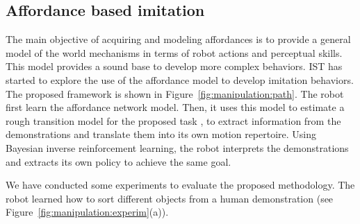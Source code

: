 \subsection{Affordance based imitation}
The main objective of acquiring and modeling affordances is to provide
a general model of the world mechanisms in terms of robot actions and
perceptual skills. This model provides a sound base to develop more
complex behaviors. IST has started to explore the use of the
affordance model to develop imitation behaviors. The proposed
framework is shown in Figure~\ref{fig:manipulation:path}. The robot
first learn the affordance network model. Then, it uses this model to
estimate a rough transition model for the proposed task , to extract
information from the demonstrations and translate them into its own
motion repertoire. Using Bayesian inverse reinforcement learning, the
robot interprets the demonstrations and extracts its own policy to
achieve the same goal.

We have conducted some experiments to evaluate the proposed methodology. The robot learned how to sort different objects from a human demonstration (see Figure~\ref{fig:manipulation:experim}(a)).
 
